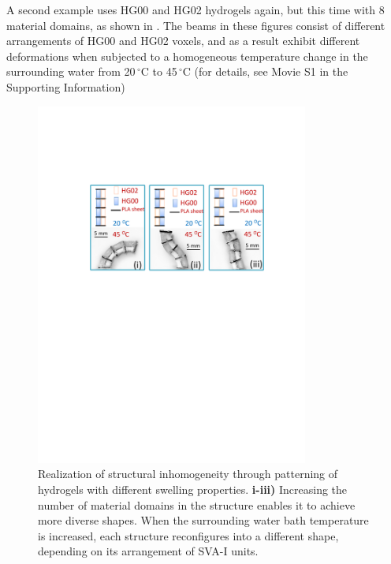 A second example uses HG00 and HG02 hydrogels again, but this time with 
8 material domains, as shown in . The beams in these figures consist of different arrangements of HG00 and HG02 voxels, and as a result exhibit different deformations when subjected to a homogeneous temperature change in the surrounding water from 20\,$^{\circ}$C to 45\,$^{\circ}$C (for details, see Movie S1 in the Supporting Information)\\
\begin{figure}[!ht]
\centering
\includegraphics[width=0.8\textwidth]{hardcoded.pdf}
\caption[Using SVAs to increase deformation domains]{Realization of structural inhomogeneity through patterning of hydrogels with different swelling properties. \textbf{i-iii)} Increasing the number of material domains in the structure enables it to achieve more diverse shapes. When the surrounding water bath temperature is increased, each structure reconfigures into a different shape, depending on its arrangement of SVA-I units.}
\label{fig:hardcoded}
\end{figure}

